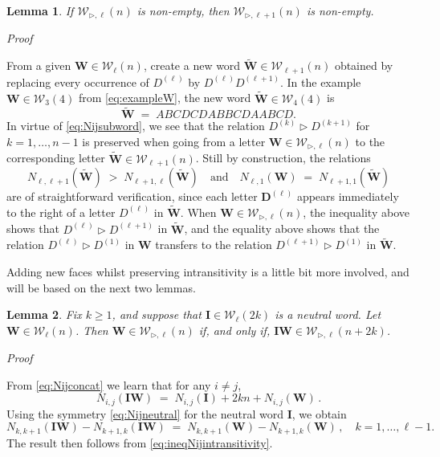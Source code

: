 \documentclass[reqno,a4paper,11pt]{amsart}
\makeatletter
\newcommand{\btt}{\triangleright}
\newtheorem{lemma}{Lemma}
\theoremstyle{remark}
\newcommand{\mc}[1]{{\mathcal #1}}
\newcommand{\mb}[1]{{\mathbf #1}}
\numberwithin{equation}{section}
\renewenvironment{proof}[1][Proof]{\par
\pushQED{\qed}%
\normalfont \topsep6\p@\@plus6\p@\relax
\trivlist
\item\relax
{\itshape
#1\@addpunct{.}}\hspace\labelsep\ignorespaces
}{%
\popQED\endtrivlist\@endpefalse
}
\makeatother
\begin{document}
\begin{lemma}\label{lem:WellWellplus}
If $\mc W_{\btt,\ell}(n)$ is non-empty, then $\mc W_{\btt,\ell+1}(n)$ is non-empty.
\end{lemma}
\begin{proof}
From a given $\mb W\in \mc W_{\ell}(n)$, create a new word $\widetilde{\mb W}\in \mc W_{\ell+1}(n)$ obtained by replacing every occurrence of $D^{(\ell)}$ by $D^{(\ell)}D^{(\ell+1)}$. In the example $\mb W\in \mc W_{3}(4)$ from \eqref{eq:exampleW}, the new word $\widetilde{\mb W}\in \mc W_{4}(4)$ is
%
$$
\widetilde{\mb W}\;=\;ABCDCDABBCDAABCD.
$$
%
In virtue of \eqref{eq:Nijsubword}, we see that the relation $D^{(k)}\btt D^{(k+1)}$ for $k=1,\hdots, n-1$ is preserved when going from a letter $\mb W\in \mc W_{\btt,\ell}(n)$ to the corresponding letter $\widetilde {\mb W}\in \mc W_{\ell+1}(n)$. Still by construction, the relations
%
$$
N_{\ell,\ell+1}(\widetilde{\mb W})\;>\;N_{\ell+1,\ell}(\widetilde {\mb W}) \quad \text{and} \quad
N_{\ell,1}(\mb W)\;=\;N_{\ell+1,1}(\widetilde {\mb W})
$$
%
are of straightforward verification, since each letter $\mb D^{(\ell)}$ appears immediately to the right of a letter $D^{(\ell)}$ in $\widetilde {\mb W}$. When $\mb W\in \mc W_{\btt,\ell}(n)$, the inequality above shows that $D^{(\ell)}\btt D^{(\ell+1)}$ in $\widetilde{\mb W}$, and the equality above shows that the relation $D^{(\ell)}\btt D^{(1)}$ in $\mb W$ transfers to the relation $D^{(\ell+1)}\btt D^{(1)}$ in $\widetilde {\mb W}$.
\end{proof}

Adding new faces whilst preserving intransitivity is a little bit more involved, and will be based on the next two lemmas.

\begin{lemma}\label{neutral string}
Fix $k\geq 1$, and suppose that $\mb I \in\mc W_{\ell}(2k)$ is a neutral word. Let $\mb W\in \mc W_\ell(n)$. Then $\mb W\in \mc W_{\btt,\ell}(n)$ if, and only if, $\mb I\mb W\in \mc W_{\btt, \ell}(n+2k)$.
\end{lemma}

\begin{proof}
From \eqref{eq:Nijconcat} we learn that for any $i\neq j$,
%
$$
N_{i,j}(\mb I\mb W)\;=\;N_{i,j}(\mb I)+2kn+N_{i,j}(\mb W)\,.
$$
%
Using the symmetry \eqref{eq:Nijneutral} for the neutral word $\mb I$, we obtain
%
$$
N_{k,k+1}(\mb I\mb W)-N_{k+1,k}(\mb I\mb W)\;=\;
N_{k,k+1}({\mb W})-N_{k+1,k}({\mb W})\,,\quad k=1,\hdots, \ell-1.
$$
%
The result then follows from \eqref{eq:ineqNijintransitivity}.            \end{proof}
\end{document}
